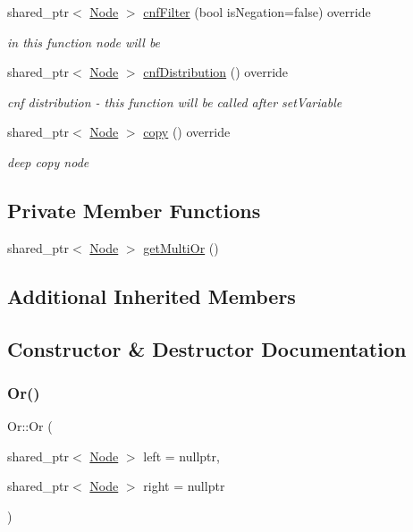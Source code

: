 \begin{DoxyCompactItemize}
shared\+\_\+ptr$<$ \hyperlink{class_node}{Node} $>$ \hyperlink{class_or_ad8a208aee185d567ede5c92f39796faa}{cnf\+Filter} (bool is\+Negation=false) override
\begin{DoxyCompactList}\small\item\em in this function node will be \end{DoxyCompactList}\item 
shared\+\_\+ptr$<$ \hyperlink{class_node}{Node} $>$ \hyperlink{class_or_ae49bee04503f31d32750ecf8671e5552}{cnf\+Distribution} () override
\begin{DoxyCompactList}\small\item\em cnf distribution -\/ this function will be called after set\+Variable \end{DoxyCompactList}\item 
shared\+\_\+ptr$<$ \hyperlink{class_node}{Node} $>$ \hyperlink{class_or_a35728ed23db1ec805267d8d244629a62}{copy} () override
\begin{DoxyCompactList}\small\item\em deep copy node \end{DoxyCompactList}\end{DoxyCompactItemize}
\subsection*{Private Member Functions}
\begin{DoxyCompactItemize}
\item 
shared\+\_\+ptr$<$ \hyperlink{class_node}{Node} $>$ \hyperlink{class_or_a1d32e059bdc6ff80fb4798c90553e2cb}{get\+Multi\+Or} ()
\end{DoxyCompactItemize}
\subsection*{Additional Inherited Members}


\subsection{Constructor \& Destructor Documentation}
\mbox{\label{class_or_a3247e4bae89e48da60037469ba896128}} 
\subsubsection{\texorpdfstring{Or()}{Or()}}
{\footnotesize\ttfamily Or\+::\+Or (\begin{DoxyParamCaption}\item[{shared\+\_\+ptr$<$ \hyperlink{class_node}{Node} $>$}]{left = {\ttfamily nullptr},  }\item[{shared\+\_\+ptr$<$ \hyperlink{class_node}{Node} $>$}]{right = {\ttfamily nullptr} }\end{DoxyParamCaption})\hspace{0.3cm}{\ttfamily [explicit]}}

